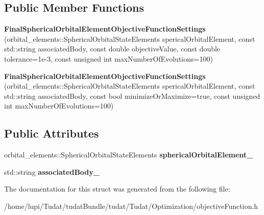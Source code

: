 \subsection*{Public Member Functions}
\begin{DoxyCompactItemize}
\item 
{\bfseries Final\+Spherical\+Orbital\+Element\+Objective\+Function\+Settings} (orbital\+\_\+elements\+::\+Spherical\+Orbital\+State\+Elements sperical\+Orbital\+Element, const std\+::string associated\+Body, const double objective\+Value, const double tolerance=1e-\/3, const unsigned int max\+Number\+Of\+Evolutions=100)\hypertarget{structtudat_1_1optimization_1_1FinalSphericalOrbitalElementObjectiveFunctionSettings_afdce3ee3cc024663778b5322b79927bc}{}\label{structtudat_1_1optimization_1_1FinalSphericalOrbitalElementObjectiveFunctionSettings_afdce3ee3cc024663778b5322b79927bc}

\item 
{\bfseries Final\+Spherical\+Orbital\+Element\+Objective\+Function\+Settings} (orbital\+\_\+elements\+::\+Spherical\+Orbital\+State\+Elements sperical\+Orbital\+Element, const std\+::string associated\+Body, const bool minimize\+Or\+Maximize=true, const unsigned int max\+Number\+Of\+Evolutions=100)\hypertarget{structtudat_1_1optimization_1_1FinalSphericalOrbitalElementObjectiveFunctionSettings_a8b3ebcb323ba91868a6b1a06a5fccd81}{}\label{structtudat_1_1optimization_1_1FinalSphericalOrbitalElementObjectiveFunctionSettings_a8b3ebcb323ba91868a6b1a06a5fccd81}

\end{DoxyCompactItemize}
\subsection*{Public Attributes}
\begin{DoxyCompactItemize}
\item 
orbital\+\_\+elements\+::\+Spherical\+Orbital\+State\+Elements {\bfseries spherical\+Orbital\+Element\+\_\+}\hypertarget{structtudat_1_1optimization_1_1FinalSphericalOrbitalElementObjectiveFunctionSettings_af72d70a958dbdaa0e5e644512f15a46a}{}\label{structtudat_1_1optimization_1_1FinalSphericalOrbitalElementObjectiveFunctionSettings_af72d70a958dbdaa0e5e644512f15a46a}

\item 
std\+::string {\bfseries associated\+Body\+\_\+}\hypertarget{structtudat_1_1optimization_1_1FinalSphericalOrbitalElementObjectiveFunctionSettings_a937b3ffdd0bfe624e6a5aba979a680ca}{}\label{structtudat_1_1optimization_1_1FinalSphericalOrbitalElementObjectiveFunctionSettings_a937b3ffdd0bfe624e6a5aba979a680ca}

\end{DoxyCompactItemize}


The documentation for this struct was generated from the following file\+:\begin{DoxyCompactItemize}
\item 
/home/lupi/\+Tudat/tudat\+Bundle/tudat/\+Tudat/\+Optimization/objective\+Function.\+h\end{DoxyCompactItemize}
